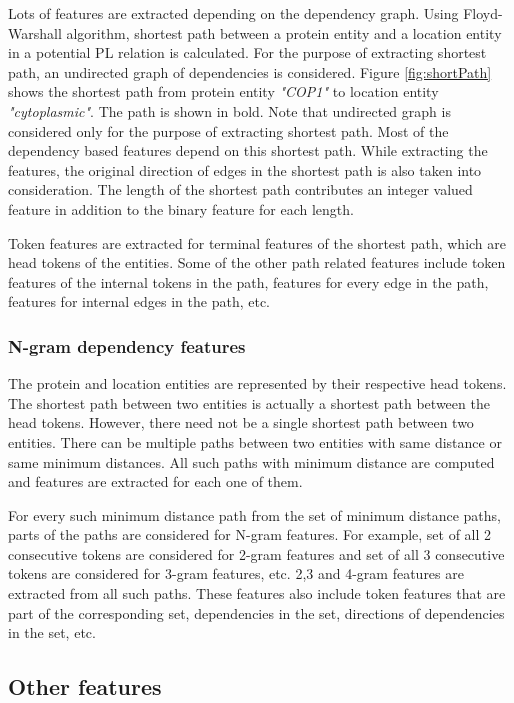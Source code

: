 Lots of features are extracted depending on the dependency graph. Using Floyd-Warshall algorithm, shortest path between a protein entity and a location entity in a potential PL relation is calculated. For the purpose of extracting shortest path, an undirected graph of dependencies is considered. Figure \ref{fig:shortPath} shows the shortest path from protein entity \textit{"COP1"} to location entity \textit{"cytoplasmic"}. The path is shown in bold. Note that undirected graph is considered only for the purpose of extracting shortest path.  Most of the dependency based features depend on this shortest path. While extracting the features, the original direction of edges in the shortest path is also taken into consideration. The length of the shortest path contributes an integer valued feature in addition to the binary feature for each length.

Token features are extracted for terminal features of the shortest path, which are head tokens of the entities. Some of the other path related features include token features of the internal tokens in the path, features for every edge in the path, features for internal edges in the path, etc.

\subsubsection*{N-gram dependency features}

The protein and location entities are represented by their respective head tokens.  The shortest path between two entities is actually a shortest path between the head tokens. However, there need not be a single shortest path between two entities. There can be multiple paths between two entities with same distance or same minimum distances. All such paths with minimum distance are computed and features are extracted for each one of them.

For every such minimum distance path from the set of minimum distance paths, parts of the paths are considered for N-gram features. For example, set of all 2 consecutive tokens are considered for 2-gram features and set of all 3 consecutive tokens are considered for 3-gram features, etc. 2,3 and 4-gram features are extracted from all such paths. These features also include token features that are part of the corresponding set, dependencies in the set, directions of dependencies in the set, etc. 

\subsection*{Other features}


